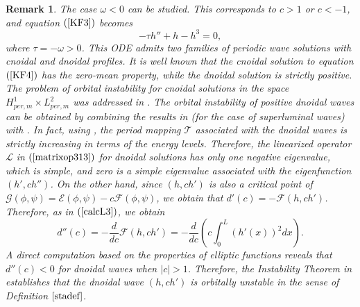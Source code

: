 \documentclass[12pt,reqno,a4paper]{amsart} %
\numberwithin{equation}{section}
\numberwithin{figure}{section}
\newtheorem{remark}[theorem]{Remark}
\begin{document}
\begin{remark}
	The case $\omega < 0$ can be studied. This corresponds to $c > 1$ or $c < -1$, and equation $(\ref{KF3})$ becomes \begin{equation}\label{KF4}-\tau h''+h-h^3=0,\end{equation} where $\tau = -\omega > 0$. This ODE admits two families of periodic wave solutions with cnoidal and dnoidal profiles. It is well known that the cnoidal solution to equation $(\ref{KF4})$ has the zero-mean property, while the dnoidal solution is strictly positive. The problem of orbital instability for cnoidal solutions in the space $H_{per,m}^1\times L_{per,m}^2$ was addressed in \cite{loreno1}. The orbital instability of positive dnoidal waves can be obtained by combining the results in \cite{palacios} (for the case of superluminal waves) with \cite{grillakis1}. In fact, using \cite[Remark 3.2]{palacios}, the period mapping $\mathcal{T}$ associated with the dnoidal waves is strictly increasing in terms of the energy levels. Therefore, the linearized operator $\mathcal{L}$ in $(\ref{matrixop313})$ for dnoidal solutions  has only one negative eigenvalue, which is simple, and zero is a simple eigenvalue associated with the eigenfunction $(h',ch'')$. On the other hand, since $(h,ch')$ is also a critical point of $\mathcal{G}(\phi,\psi)=\mathcal{E}(\phi,\psi)-c\mathcal{F}(\phi,\psi)$, we obtain that $d'(c)=-\mathcal{F}(h,ch')$. Therefore, as in $(\ref{calcL3})$, we obtain $$d''(c)=-\frac{d}{dc}\mathcal{F}(h,ch')=-\frac{d}{dc}\left(c\int_0^L(h'(x))^2dx\right).$$
	A direct computation based on the properties of elliptic functions reveals that $d''(c)<0$ for dnoidal waves when $|c|>1$. Therefore, the Instability Theorem in \cite{grillakis1} establishes that the dnoidal wave $(h,ch')$ is orbitally unstable in the sense of Definition $\ref{stadef}$.
	
\end{remark}
\end{document}

